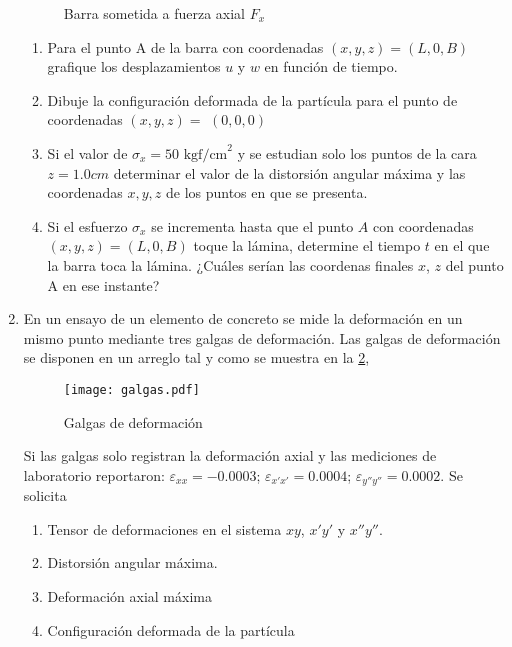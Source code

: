 \documentclass[../notas medios.tex]{subfiles}
\begin{document}
\begin{enumerate}
\begin{figure}[H]
	\centering
		\hspace{0.7cm}
		\hspace{0.7cm}
	\caption{Barra sometida a fuerza axial $F_{x}$}
	\label{fig:barra}
\end{figure}


\begin{enumerate}
	\item Para el punto A de la barra con coordenadas  $(x,y,z) = (L, 0, B)$ grafique los desplazamientos $u$ y $w$ en función de tiempo. 
	\item Dibuje la configuración deformada de la partícula para el punto de coordenadas $(x,y,z)=$ $(0,0,0)$ 
	\item  Si el valor de $\sigma_x = 50 \text{ kgf/cm}^2$ y se estudian solo 
	los puntos de la cara $ z = 1.0 cm$ determinar el valor de la distorsión 
	angular máxima y las coordenadas $x,y,z$ de los puntos  en que se 
	presenta. 	
	\item Si el esfuerzo  $\sigma_x$ se incrementa  hasta que el punto  $A$ con coordenadas  $(x,y,z) = (L, 0, B)$ toque la lámina, determine el tiempo $t$  en el que la barra toca la lámina. ¿Cuáles serían las coordenas finales $x$, $z$ del punto A en ese instante?

\end{enumerate}


\item  \label{punto13_d}  En un ensayo de un elemento de concreto se mide la deformación en un mismo punto mediante tres galgas de deformación. Las galgas de deformación se disponen en un arreglo tal y como se muestra en la \cref{ensayogalga},

	\begin{figure}[H]
		\centering
		\hspace*{6mm}
			\texttt{[image: galgas.pdf]}
		\caption{ Galgas de deformación}
		\label{ensayogalga}
	\end{figure}

Si las galgas solo registran la deformación axial y las mediciones de laboratorio reportaron: $\varepsilon_{xx} = -0.0003$; $\varepsilon_{x'x'} = 0.0004$; $\varepsilon_{y''y''} = 0.0002$. Se solicita

\begin{enumerate}
\item Tensor de deformaciones en el sistema $xy$, $x'y'$ y $x''y''$. 

\item Distorsión angular máxima. 

\item Deformación axial máxima

\item Configuración deformada de la partícula
\end{enumerate}

\end{enumerate}
\end{document}
